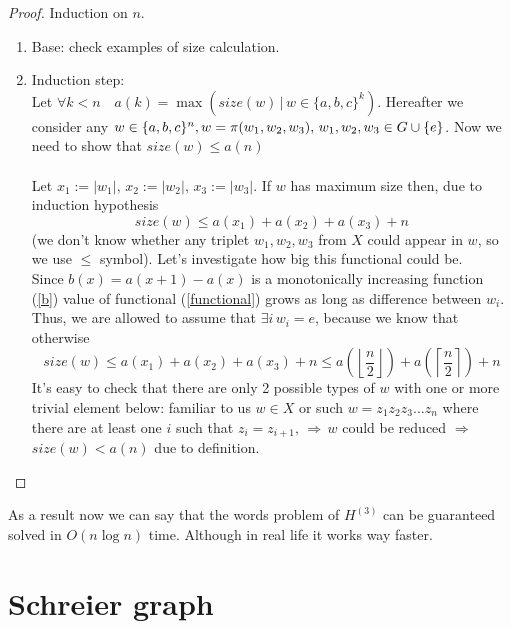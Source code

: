 \documentclass[a4paper,12pt]{amsart}
\begin{document}
\begin{proof}
	Induction on $n$.
	\begin{enumerate}
		\item Base: check examples of size calculation.
		\item Induction step:\\ 
		Let $\forall k < n \quad a (k) = \max (size(w) \,|\, w \in \{a,b,c\}^k)$. Hereafter we consider any $w \in \{a, b, c\}^{n}, \,\\ w = \pi (w_1, w_2, w_3), \, w_1, w_2, w_3 \in G \cup \{e\}$. Now we need to show that $size(w) \le a(n)$\\
		\\
		Let $ x_1 := |w_1|, \, x_2 := |w_2|, \, x_3 := |w_3|$. If $w$ has maximum size then, due to induction hypothesis \\ 
		\begin{equation}
		\label{functional}
		size(w) \le a(x_1) + a(x_2) + a(x_3) + n
		\end{equation}
		(we don't know whether any triplet $w_1, w_2, w_3$ from $X$ could appear in $w$, so we use $\le$ symbol). Let's investigate how big this functional could be.\\
		
		Since $b(x) = a(x + 1) - a(x)$ is a monotonically increasing function (\ref{b}) value of functional (\ref{functional})
		grows as long as difference between $w_i$. Thus,
		we are allowed to assume that $\exists i \, w_i = e$, because we know that otherwise
		$$size(w) \le a(x_1) + a(x_2) + a(x_3) + n \le a\left(
			\left\lfloor
				\frac{n}{2}
			\right\rfloor 
		\right) + a \left(
			\left\lceil
				\frac{n}{2}
			\right\rceil
		\right) + n$$
		It's easy to check that there are only 2 possible types of $w$ with one or more trivial element below: familiar to us $w \in X$ or such $w = z_1 z_2 z_3 ... z_n$ where there are at least one $i$ such that $z_i = z_{i+1}, \, \Rightarrow \, w$ could be reduced $\Rightarrow$ $size(w) < a(n)$ due to definition.
	\end{enumerate}
	
\end{proof}


As a result now we can say that the words problem of $H^{(3)}$ can be guaranteed solved in $O(n \log n)$ time. 
Although in real life it works way faster.


\section{Schreier graph}
\end{document}
